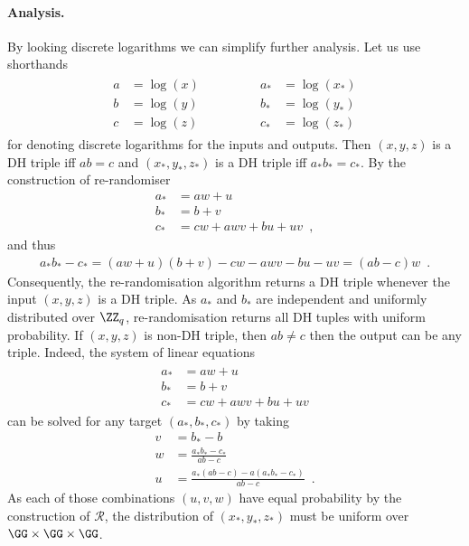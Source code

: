 \documentclass{crypto-exercise}
\newcommand{\RERAND}{\mathscr{R}}
\begin{document}
\begin{solution}
\paragraph{Analysis.}
By looking discrete logarithms we can simplify further analysis. 
Let us use shorthands
\begin{align*}
\begin{aligned}
a&=\log(x)\\
b&=\log(y)\\
c&=\log(z)
\end{aligned}
\qquad\qquad
\begin{aligned}
a_*&=\log(x_*)\\
b_*&=\log(y_*)\\
c_*&=\log(z_*)
\end{aligned}
\end{align*}
for denoting discrete logarithms for the inputs and outputs. 
Then $(x,y,z)$ is a DH triple iff $ab = c$ and $(x_*,y_*,z_*)$ is a DH triple iff $a_*b_*=c_*$. By the construction of re-randomiser
\begin{align*}
a_*&=aw+u\\
b_*&=b+v\\
c_*&=cw+awv+bu+uv\enspace,
\end{align*}
and thus
\begin{align*}
a_*b_*-c_*=(aw+u)(b+v)-cw-awv-bu-uv= (ab-c)w\enspace.
\end{align*} 
Consequently, the re-randomisation algorithm returns a DH triple whenever the input $(x,y,z)$ is a DH triple. As $a_*$ and $b_*$ are independent and uniformly distributed over $\ZZ_q$, re-randomisation returns all DH tuples with uniform probability. If $(x,y,z)$ is non-DH triple, then $ab\neq c$ then the output can be any triple. Indeed, the system of linear equations 
\begin{align}
\label{eq:io-map}
\begin{aligned}
a_*&=aw+u\\
b_*&=b+v\\
c_*&=cw+awv+bu+uv
\end{aligned}
\end{align}
can be solved for any target $(a_*,b_*,c_*)$ by taking
\begin{align*}
v&=b_*-b \\
w&=\frac{a_*b_*-c_*}{ab-c}\\
u&=\frac{a_*(ab-c)-a(a_*b_*-c_*)}{ab-c}\enspace.
\end{align*}
As each of those combinations $(u,v,w)$ have equal probability by the construction of $\RERAND$, the distribution of $(x_*,y_*,z_*)$ must be uniform over $\GG\times\GG\times\GG$. 
 


\end{solution}
\end{document}
